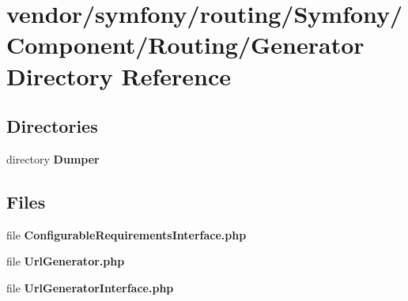 \section{vendor/symfony/routing/\+Symfony/\+Component/\+Routing/\+Generator Directory Reference}
\label{dir_9390823dda575f323dc8f30cca2de03d}
\subsection*{Directories}
\begin{DoxyCompactItemize}
\item 
directory {\bf Dumper}
\end{DoxyCompactItemize}
\subsection*{Files}
\begin{DoxyCompactItemize}
\item 
file {\bf Configurable\+Requirements\+Interface.\+php}
\item 
file {\bf Url\+Generator.\+php}
\item 
file {\bf Url\+Generator\+Interface.\+php}
\end{DoxyCompactItemize}
